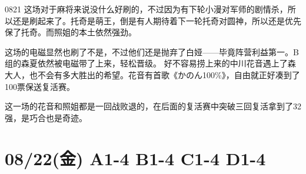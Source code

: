 
0821 这场对于麻将来说没什么好刷的，不过因为有下轮小漫对军师的剧情杀，所以还是刷起来了。托奇是萌王，倒是有人期待着下一轮托奇对圆神，所以还是优先保了托奇。而照姐的本土依然强劲。

这场的电磁显然也刷了不是，不过他们还是抛弃了白娅——毕竟阵营利益第一。B组的森夏依然被电磁带了上来，轻松晋级。
好不容易捞上来的中川花音遇上了森大人，也不会有多大胜出的希望。花音有首歌《かのん100\%》，自由就正好凑到了100票保送复活赛。

这一场的花音和照姐都是一回战败退的，在后面的复活赛中突破三回复活拿到了32强，是巧合也是奇迹。

\section{08/22(金) A1-4 B1-4 C1-4 D1-4}

